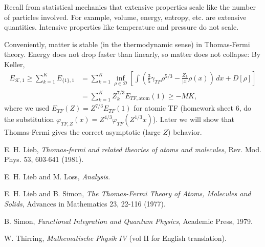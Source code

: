 \documentclass[11pt]{amsart}
\theoremstyle{definition}
\theoremstyle{definition}
\theoremstyle{definition}
\numberwithin{equation}{section}
\begin{document}
Recall from statistical mechanics that extensive properties scale like the number of particles involved. For example, volume, energy, entropy, etc. are extensive quantities. Intensive properties like temperature and pressure do not scale.

Conveniently, matter is stable (in the thermodynamic sense) in Thomas-Fermi theory. Energy does not drop faster than linearly, so matter does not collapse: By Keller,
\begin{align*}
E_{\mathcal{K},1}\ge\sum_{k=1}^KE_{\{1\},1}&=\sum_{k=1}^K\inf_{\rho\in\mathcal{D}}\left[\int\left(\frac{3}{5}\gamma_{TF}\rho^{5/3}-\frac{Z_k}{|x|}\rho(x)\right)\,dx+D[\rho]\right]\\
&=\sum_{k=1}^K Z_k^{7/3}E_{TF,\text{atom}}(1)\ge -MK,
\end{align*}
where we used $E_{TF}(Z)=Z^{7/3}E_{TF}(1)$ for atomic TF (homework sheet 6, do the substitution $\varphi_{TF,Z}(x)=Z^{4/3}\varphi_{TF}(Z^{1/3}x)$).
Later we will show that Thomas-Fermi gives the correct asymptotic (large $Z$) behavior.






\begin{thebibliography}{99}
 E. H. Lieb, \textit{Thomas-fermi and related theories of atoms and molecules}, Rev. Mod. Phys. 53, 603-641 (1981).

 E. H. Lieb and M. Loss, \textit{Analysis}.

 E. H. Lieb and B. Simon, \textit{The Thomas-Fermi Theory of Atoms, Molecules and Solids}, Advances in Mathematics 23, 22-116 (1977).

 B. Simon, \textit{Functional Integration and Quantum Physics}, Academic Press, 1979.

 W. Thirring, \textit{Mathematische Physik IV} (vol II for English translation).
\end{thebibliography}
\end{document}
